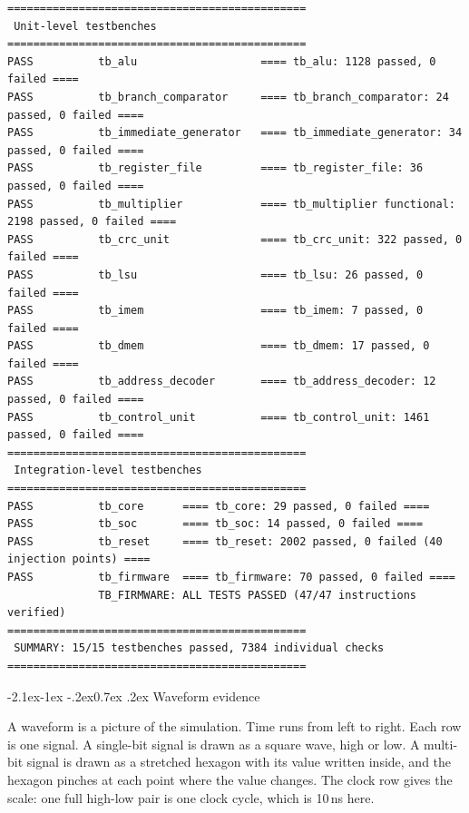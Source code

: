 \documentclass[11pt,a4paper]{article}
\makeatletter
\renewcommand\subsection{\@startsection{subsection}{2}{\z@}%
  {-2.1ex\@plus -1ex \@minus -.2ex}{0.7ex \@plus .2ex}%
  {\color{rvbldark}\normalfont\normalsize\bfseries}}
\makeatother
\begin{document}
\begin{lstlisting}[caption={The reference regression, run block by block against the
reference design, and copied into this report without editing. \texttt{tb\_gatelevel} needs
a synthesised netlist. When that netlist is absent the suite skips this testbench and does
not fail it. With it, the suite is 16 of 16 and 8{,}285 checks.},
label={lst:runall},captionpos=b]
==============================================
 Unit-level testbenches
==============================================
PASS          tb_alu                   ==== tb_alu: 1128 passed, 0 failed ====
PASS          tb_branch_comparator     ==== tb_branch_comparator: 24 passed, 0 failed ====
PASS          tb_immediate_generator   ==== tb_immediate_generator: 34 passed, 0 failed ====
PASS          tb_register_file         ==== tb_register_file: 36 passed, 0 failed ====
PASS          tb_multiplier            ==== tb_multiplier functional: 2198 passed, 0 failed ====
PASS          tb_crc_unit              ==== tb_crc_unit: 322 passed, 0 failed ====
PASS          tb_lsu                   ==== tb_lsu: 26 passed, 0 failed ====
PASS          tb_imem                  ==== tb_imem: 7 passed, 0 failed ====
PASS          tb_dmem                  ==== tb_dmem: 17 passed, 0 failed ====
PASS          tb_address_decoder       ==== tb_address_decoder: 12 passed, 0 failed ====
PASS          tb_control_unit          ==== tb_control_unit: 1461 passed, 0 failed ====
==============================================
 Integration-level testbenches
==============================================
PASS          tb_core      ==== tb_core: 29 passed, 0 failed ====
PASS          tb_soc       ==== tb_soc: 14 passed, 0 failed ====
PASS          tb_reset     ==== tb_reset: 2002 passed, 0 failed (40 injection points) ====
PASS          tb_firmware  ==== tb_firmware: 70 passed, 0 failed ====
              TB_FIRMWARE: ALL TESTS PASSED (47/47 instructions verified)
==============================================
 SUMMARY: 15/15 testbenches passed, 7384 individual checks
==============================================
\end{lstlisting}

\subsection{Waveform evidence}

A waveform is a picture of the simulation. Time runs from left to right. Each row is one
signal. A single-bit signal is drawn as a square wave, high or low. A multi-bit signal is
drawn as a stretched hexagon with its value written inside, and the hexagon pinches at each
point where the value changes. The clock row gives the scale: one full high-low pair is one
clock cycle, which is 10\,ns here.
\end{document}
